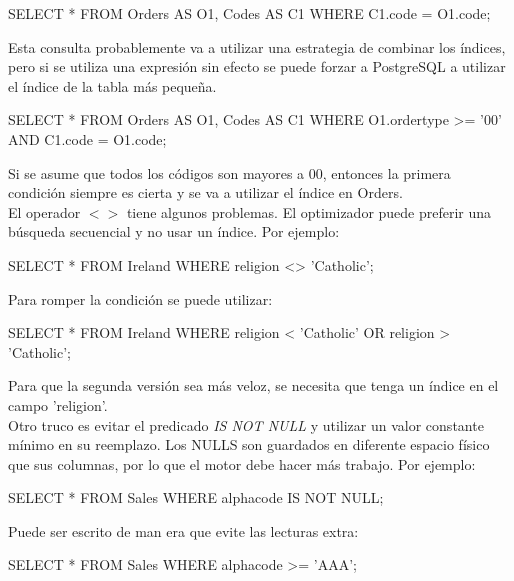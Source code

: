 \begin{pyglist}
SELECT *
  FROM Orders AS O1, Codes AS C1
 WHERE C1.code = O1.code;
\end{pyglist}

Esta consulta probablemente va a utilizar una estrategia de combinar los índices, pero si se utiliza una expresión sin efecto se puede forzar a PostgreSQL a utilizar el índice de la tabla más pequeña.\\

\begin{pyglist}
SELECT *
  FROM Orders AS O1, Codes AS C1
 WHERE O1.ordertype >= '00'
   AND C1.code = O1.code;
\end{pyglist}

Si se asume que todos los códigos son mayores a 00, entonces la primera condición siempre es cierta y se va a utilizar el índice en Orders.\\

El operador $<>$ tiene algunos problemas. El optimizador puede preferir una búsqueda secuencial y no usar un índice. Por ejemplo:\\

\begin{pyglist}
SELECT *
  FROM Ireland
 WHERE religion <> 'Catholic';
\end{pyglist}

Para romper la condición se puede utilizar:\\

\begin{pyglist}
SELECT *
  FROM Ireland
 WHERE religion < 'Catholic'
    OR religion > 'Catholic';
\end{pyglist}

Para que la segunda versión sea más veloz, se necesita que tenga un índice en el campo 'religion'.\\

Otro truco es evitar el predicado \textit{IS NOT NULL} y utilizar un valor constante mínimo en su reemplazo. Los NULLS son guardados en diferente espacio físico que sus columnas, por lo que el motor debe hacer más trabajo. Por ejemplo:\\

\begin{pyglist}
SELECT *
  FROM Sales
 WHERE alphacode IS NOT NULL;
\end{pyglist}

Puede ser escrito de man era que evite las lecturas extra:\\

\begin{pyglist}
SELECT *
  FROM Sales
 WHERE alphacode >= 'AAA';
\end{pyglist}

